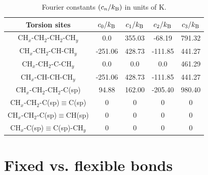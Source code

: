 \documentclass[journal=jctc,manuscript=article]{achemso}
\begin{document}
    \begin{table}[h!]
		\caption{Fourier constants $(c_n/k_{\rm B})$ in units of K.} \label{tab:torsions} %
		\begin{center}
			\begin{tabular}{|c|c|c|c|c|}
				\hline
				Torsion sites & $c_0/k_{\rm B}$ & $c_1/k_{\rm B}$ & $c_2/k_{\rm B}$ & $c_3/k_{\rm B}$ \\ \hline
				CH$_x$-CH$_2$-CH$_2$-CH$_y$ & 0.0 & 355.03 & -68.19 & 791.32 \\ 
				CH$_x$-CH$_2$-CH-CH$_y$ & -251.06 & 428.73 & -111.85 & 441.27 \\
				CH$_x$-CH$_2$-C-CH$_y$ & 0.0 & 0.0 & 0.0 & 461.29 \\
				CH$_x$-CH-CH-CH$_y$ & -251.06 & 428.73 & -111.85 & 441.27 \\
				CH$_x$-CH$_2$-CH$_2$-C(sp) & 94.88 & 162.00 & -205.40 & 980.40 \\
				CH$_x$-CH$_2$-C(sp)$\equiv$C(sp) & 0 & 0 & 0 & 0 \\
				CH$_x$-CH$_2$-C(sp)$\equiv$CH(sp) & 0 & 0 & 0 & 0 \\
				CH$_x$-C(sp)$\equiv$C(sp)-CH$_y$ & 0 & 0 & 0 & 0 \\
				\hline
			\end{tabular}
		\end{center} 
	\end{table}


\newpage
\clearpage

\section{Fixed vs. flexible bonds} \label{SI sec: Fixed vs flexible bonds}
\end{document}
